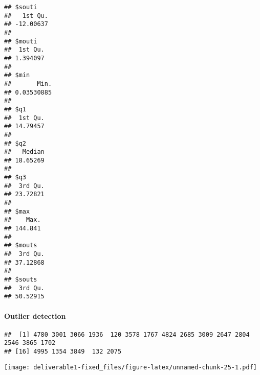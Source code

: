 \documentclass[
  18pt,
  a4paper]{article}
\newenvironment{Shaded}{\begin{snugshade}}{\end{snugshade}}
\newcommand{\DataTypeTok}[1]{\textcolor[rgb]{0.13,0.29,0.53}{#1}}
\newcommand{\DecValTok}[1]{\textcolor[rgb]{0.00,0.00,0.81}{#1}}
\newcommand{\KeywordTok}[1]{\textcolor[rgb]{0.13,0.29,0.53}{\textbf{#1}}}
\newcommand{\NormalTok}[1]{#1}
\newcommand{\OperatorTok}[1]{\textcolor[rgb]{0.81,0.36,0.00}{\textbf{#1}}}
\newcommand{\OtherTok}[1]{\textcolor[rgb]{0.56,0.35,0.01}{#1}}
\newcommand{\StringTok}[1]{\textcolor[rgb]{0.31,0.60,0.02}{#1}}
\begin{document}
\begin{verbatim}
## $souti
##   1st Qu. 
## -12.00637 
## 
## $mouti
##  1st Qu. 
## 1.394097 
## 
## $min
##       Min. 
## 0.03530885 
## 
## $q1
##  1st Qu. 
## 14.79457 
## 
## $q2
##   Median 
## 18.65269 
## 
## $q3
##  3rd Qu. 
## 23.72821 
## 
## $max
##    Max. 
## 144.841 
## 
## $mouts
##  3rd Qu. 
## 37.12868 
## 
## $souts
##  3rd Qu. 
## 50.52915
\end{verbatim}

\hypertarget{outlier-detection}{%
\paragraph{Outlier detection}\label{outlier-detection}}

\begin{Shaded}
\end{Shaded}

\begin{verbatim}
##  [1] 4780 3001 3066 1936  120 3578 1767 4824 2685 3009 2647 2804 2546 3865 1702
## [16] 4995 1354 3849  132 2075
\end{verbatim}

\begin{Shaded}
\end{Shaded}

\texttt{[image: deliverable1-fixed\_files/figure-latex/unnamed-chunk-25-1.pdf]}

\begin{Shaded}
\end{Shaded}
\end{document}
